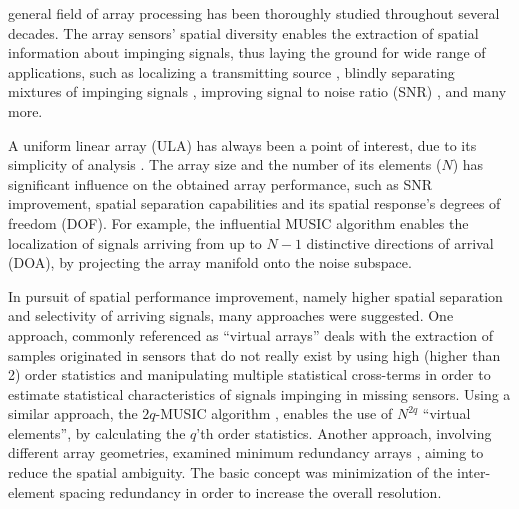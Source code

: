 general field of array processing has been thoroughly studied throughout several decades.
The array sensors' spatial diversity enables the extraction of spatial information about impinging signals, thus laying the ground for wide range of applications, such as localizing a transmitting source \cite{skolnik2008radar,long2019}, blindly separating mixtures of impinging signals \cite{comon1994independent}, improving signal to noise ratio (SNR) \cite{verdu1998multiuser}, and many more. 
\par A uniform linear array (ULA) has always been a point of interest, due to its simplicity of analysis \cite{van2004optimum,benesty2018}. 
The array size and the number of its elements ($N$) has significant influence on the obtained array performance, such as SNR improvement, spatial separation capabilities and its spatial response's degrees of freedom (DOF). For example, the influential MUSIC algorithm \cite{schmidt1986multiple} enables the localization of signals arriving from up to $N-1$ distinctive directions of arrival (DOA), by projecting the array manifold onto the noise subspace.
\par In pursuit of spatial performance improvement, namely higher spatial separation and selectivity of arriving signals, many approaches were suggested.  
One approach, commonly referenced as ``virtual arrays'' \cite{pal2010nested,chevalier2005virtual,dogan1995applications} deals with the extraction of samples originated in sensors that do not really exist by using high (higher than 2) order statistics and manipulating multiple statistical cross-terms in order to estimate statistical characteristics of signals impinging in missing sensors.
Using a similar approach, the $2q$-MUSIC algorithm \cite{chevalier2006high}, enables the use of $N^{2q}$ ``virtual elements'', by calculating the $q$'th order statistics.
Another approach, involving different array geometries, examined minimum redundancy arrays \cite{moffet1968minimum,pillai1985new,pillai1987statistical,Kupershtein2013}, aiming to reduce the spatial ambiguity. The basic concept was minimization of the inter-element spacing redundancy in order to increase the overall resolution. 
